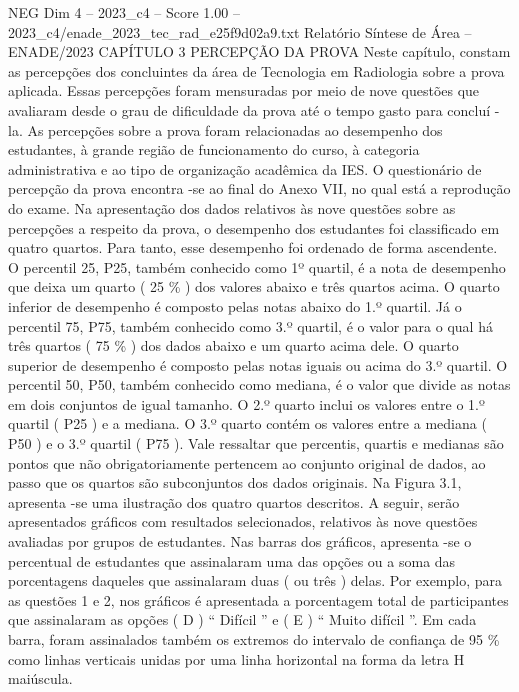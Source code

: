 \begin{textsample}{NEG Dim 4 – 2023\_c4 – Score 1.00 – 2023\_c4/enade\_2023\_tec\_rad\_e25f9d02a9.txt}  \label{ex:f4_neg_197}
Relatório Síntese de Área – ENADE/2023 CAPÍTULO 3 PERCEPÇÃO DA PROVA Neste capítulo, constam as percepções dos concluintes da área de Tecnologia em Radiologia sobre a prova aplicada.
Essas percepções foram mensuradas por meio de nove questões que avaliaram desde o grau de dificuldade da prova até o tempo gasto para concluí -la.
As percepções sobre a prova foram relacionadas ao desempenho dos estudantes, à grande região de funcionamento do curso, à categoria administrativa e ao tipo de organização acadêmica da IES.
O questionário de percepção da prova encontra -se ao final do Anexo VII, no qual está a reprodução do exame.
Na apresentação dos dados relativos às nove questões sobre as percepções a respeito da prova, o desempenho dos estudantes foi classificado em quatro quartos.
Para tanto, esse desempenho foi ordenado de forma ascendente.
O percentil 25, P25, também conhecido como 1º quartil, é a nota de desempenho que deixa um quarto ( 25 \% ) dos valores abaixo e três quartos acima.
O quarto inferior de desempenho é composto pelas notas abaixo do 1.º quartil.
Já o percentil 75, P75, também conhecido como 3.º quartil, é o valor para o qual há três quartos ( 75 \% ) dos dados abaixo e um quarto acima dele.
O quarto superior de desempenho é composto pelas notas iguais ou acima do 3.º quartil.
O percentil 50, P50, também conhecido como mediana, é o valor que divide as notas em dois conjuntos de igual tamanho.
O 2.º quarto inclui os valores entre o 1.º quartil ( P25 ) e a mediana.
O 3.º quarto contém os valores entre a mediana ( P50 ) e o 3.º quartil ( P75 ).
Vale ressaltar que percentis, quartis e medianas são pontos que não obrigatoriamente pertencem ao conjunto original de dados, ao passo que os quartos são subconjuntos dos dados originais.
Na Figura 3.1, apresenta -se uma ilustração dos quatro quartos descritos.
A seguir, serão apresentados gráficos com resultados selecionados, relativos às nove questões avaliadas por grupos de estudantes.
Nas barras dos gráficos, apresenta -se o percentual de estudantes que assinalaram uma das opções ou a soma das porcentagens daqueles que assinalaram duas ( ou três ) delas.
Por exemplo, para as questões 1 e 2, nos gráficos é apresentada a porcentagem total de participantes que assinalaram as opções ( D ) “ Difícil ” e ( E ) “ Muito difícil ”.
Em cada barra, foram assinalados também os extremos do intervalo de confiança de 95 \% como linhas verticais unidas por uma linha horizontal na forma da letra H maiúscula.

\end{textsample}
